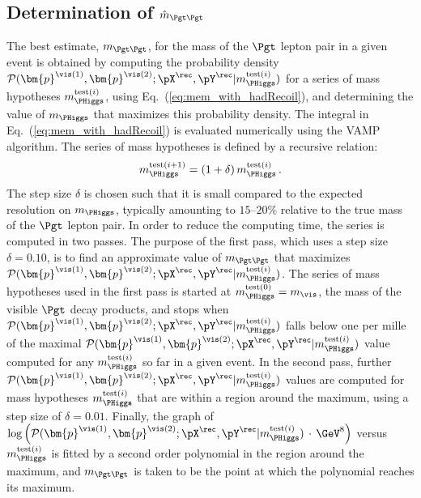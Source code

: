 \subsection{Determination of $\hat{m}_{\Pgt\Pgt}$}
\label{sec:mem_numericalMaximization}

The best estimate, $m_{\Pgt\Pgt}$, for the mass of the $\Pgt$ lepton pair in a given event
is obtained by computing the probability density $\mathcal{P}(\bm{p}^{\vis(1)},\bm{p}^{\vis(2)};\pX^{\rec},\pY^{\rec}|m_{\PHiggs}^{\textrm{test}(i)})$ 
for a series of mass hypotheses $m_{\PHiggs}^{\textrm{test}(i)}$, using Eq.~(\ref{eq:mem_with_hadRecoil}), and determining the value of $m_{\PHiggs}$ that maximizes this probability density.
The integral in Eq.~(\ref{eq:mem_with_hadRecoil}) is evaluated numerically using the VAMP algorithm.
The series of mass hypotheses is defined by a recursive relation: 
\begin{equation}
m_{\PHiggs}^{\textrm{test}(i + 1)} = (1 + \delta) \,  m_{\PHiggs}^{\textrm{test}(i)} \, .
\label{eq:mTauTau_step_size}
\end{equation}
The step size $\delta$ is chosen such that it is small compared to the
expected resolution on $m_{\PHiggs}$,
typically amounting to $15$--$20\%$ relative to the true mass of the $\Pgt$ lepton pair.
In order to reduce the computing time, the series is computed in two passes.
The purpose of the first pass, which uses a step size $\delta = 0.10$, is to find an approximate value of $m_{\Pgt\Pgt}$
that maximizes $\mathcal{P}(\bm{p}^{\vis(1)},\bm{p}^{\vis(2)};\pX^{\rec},\pY^{\rec}|m_{\PHiggs}^{\textrm{test}(i)})$.
The series of mass hypotheses used in the first pass is started at $m_{\PHiggs}^{\textrm{test}(0)} = m_{\vis}$,
the mass of the visible $\Pgt$ decay products, 
and stops when $\mathcal{P}(\bm{p}^{\vis(1)},\bm{p}^{\vis(2)};\pX^{\rec},\pY^{\rec}|m_{\PHiggs}^{\textrm{test}(i)})$ falls below one per mille 
of the maximal $\mathcal{P}(\bm{p}^{\vis(1)},\bm{p}^{\vis(2)};\pX^{\rec},\pY^{\rec}|m_{\PHiggs}^{\textrm{test}(i)})$ value
computed for any $m_{\PHiggs}^{\textrm{test}(i)}$ so far in a given event.
In the second pass, further $\mathcal{P}(\bm{p}^{\vis(1)},\bm{p}^{\vis(2)};\pX^{\rec},\pY^{\rec}|m_{\PHiggs}^{\textrm{test}(i)})$ values 
are computed for mass hypotheses $m_{\PHiggs}^{\textrm{test}(i)}$ that are within a region around the maximum,
using a step size of $\delta = 0.01$.
Finally, the graph of $\log \left( \mathcal{P}(\bm{p}^{\vis(1)},\bm{p}^{\vis(2)};\pX^{\rec},\pY^{\rec}|m_{\PHiggs}^{\textrm{test}(i)}) \, \cdot \, \mbox{\GeV}^{8} \right)$ 
versus $m_{\PHiggs}^{\textrm{test}(i)}$ is fitted by a second order polynomial
in the region around the maximum,
and $m_{\Pgt\Pgt}$ is taken to be the point at which the polynomial reaches its maximum.
